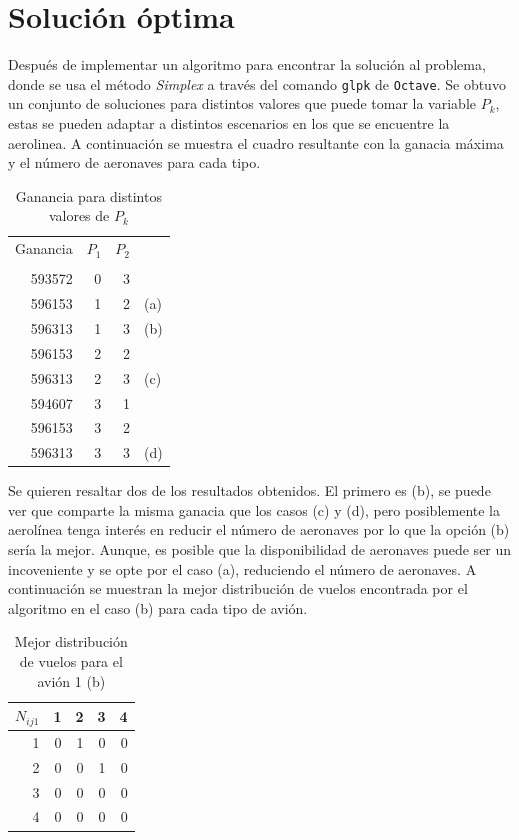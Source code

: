 \documentclass[12pt]{article}
\begin{document}
\section{Solución óptima}

Después de implementar un algoritmo para encontrar la solución al problema, donde se usa el método \emph{Simplex} a través del comando \texttt{glpk} de \texttt{Octave}. Se obtuvo un conjunto de soluciones para distintos valores que puede tomar la variable $P_{k}$, estas se pueden adaptar a distintos escenarios en los que se encuentre la aerolinea. A continuación se muestra el cuadro resultante con la ganacia máxima y el número de aeronaves para cada tipo.

\begin{table}[ht!]
    \centering
    \begin{tabular}{r | r | r l}
            Ganancia  &   $P_1$  & $P_2$ & \\
            \vspace{-15pt}\\
            \cline{1-3}
            593572  & 0  & 3 & \\
            596153  & 1  & 2 & (a)\\
            596313  & 1  & 3 & (b)\\
            596153  & 2  & 2 & \\
            596313  & 2  & 3 & (c)\\
            594607  & 3  & 1 & \\
            596153  & 3  & 2 & \\
            596313  & 3  & 3 & (d)\\
    \end{tabular}
    \caption{Ganancia para distintos valores de $P_k$}
    \label{tab:ganancia}
\end{table}

Se quieren resaltar dos de los resultados obtenidos. El primero es (b), se puede ver que comparte la misma ganacia que los casos (c) y (d), pero posiblemente la aerolínea tenga interés en reducir el número de aeronaves por lo que la opción (b) sería la mejor. Aunque, es posible que la disponibilidad de aeronaves puede ser un incoveniente y se opte por el caso (a), reduciendo el número de aeronaves. A continuación se muestran la mejor distribución de vuelos encontrada por el algoritmo en el caso (b) para cada tipo de avión.

\begin{table}[ht!]
    \centering
    \begin{tabular}{r|r|r|r|r}
        $N_{ij1}$%
               &   1  &   2  &   3  &   4\\
            \hline
            \hline
             1 & 0 & 1 & 0 & 0\\
             2 & 0 & 0 & 1 & 0\\
             3 & 0 & 0 & 0 & 0\\
             4 & 0 & 0 & 0 & 0\\
    \end{tabular}
    \caption{Mejor distribución de vuelos para el avión 1 (b)}
    \label{tab:nij1b}
\end{table}
\end{document}
